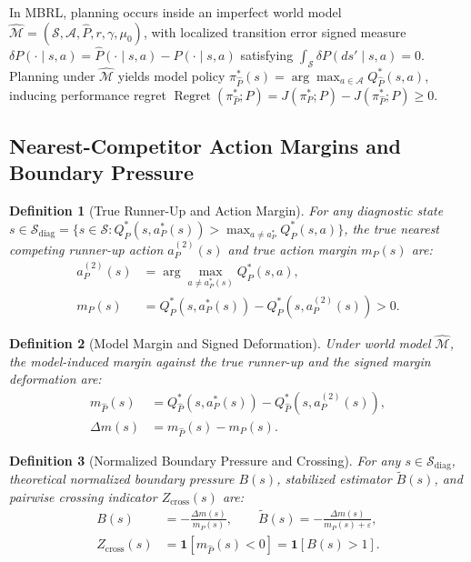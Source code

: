 \documentclass[journal,10pt,twocolumn]{IEEEtran}
\newtheorem{definition}{Definition}
\begin{document}
In MBRL, planning occurs inside an imperfect world model $\hat{\mathcal{M}} = (\mathcal{S}, \mathcal{A}, \hat{P}, r, \gamma, \mu_0)$, with localized transition error signed measure $\delta P(\cdot \mid s, a) = \hat{P}(\cdot \mid s, a) - P(\cdot \mid s, a)$ satisfying $\int_{\mathcal{S}} \delta P(ds' \mid s, a) = 0$. 
Planning under $\hat{\mathcal{M}}$ yields model policy $\pi_{\hat{P}}^*(s) = \arg\max_{a \in \mathcal{A}} Q_{\hat{P}}^*(s, a)$, inducing performance regret $\operatorname{Regret}(\pi_{\hat{P}}^*; P) = J(\pi_P^*; P) - J(\pi_{\hat{P}}^*; P) \ge 0$.

\subsection{Nearest-Competitor Action Margins and Boundary Pressure}
\label{subsec:action_margins}

\begin{definition}[True Runner-Up and Action Margin]
\label{def:runner_up_action}
For any diagnostic state $s \in \mathcal{S}_{\mathrm{diag}} = \{ s \in \mathcal{S} : Q_P^*(s, a_P^*(s)) > \max_{a \neq a_P^*} Q_P^*(s, a) \}$, the true nearest competing runner-up action $a_P^{(2)}(s)$ and true action margin $m_P(s)$ are:
\begin{align}
a_P^{(2)}(s) &= \arg\max_{a \neq a_P^*(s)} Q_P^*(s, a), \label{eq:runner_up_action} \\
m_P(s) &= Q_P^*(s, a_P^*(s)) - Q_P^*(s, a_P^{(2)}(s)) > 0. \label{eq:true_margin}
\end{align}
\end{definition}

\begin{definition}[Model Margin and Signed Deformation]
Under world model $\hat{\mathcal{M}}$, the model-induced margin against the true runner-up and the signed margin deformation are:
\begin{align}
m_{\hat{P}}(s) &= Q_{\hat{P}}^*(s, a_P^*(s)) - Q_{\hat{P}}^*(s, a_P^{(2)}(s)), \label{eq:model_margin} \\
\Delta m(s) &= m_{\hat{P}}(s) - m_P(s). \label{eq:margin_deformation}
\end{align}
\end{definition}

\begin{definition}[Normalized Boundary Pressure and Crossing]
For any $s \in \mathcal{S}_{\mathrm{diag}}$, theoretical normalized boundary pressure $B(s)$, stabilized estimator $\tilde{B}(s)$, and pairwise crossing indicator $Z_{\mathrm{cross}}(s)$ are:
\begin{align}
B(s) &= -\frac{\Delta m(s)}{m_P(s)}, \qquad \tilde{B}(s) = -\frac{\Delta m(s)}{m_P(s) + \varepsilon}, \label{eq:boundary_pressure} \\
Z_{\mathrm{cross}}(s) &= \mathbf{1}\left[ m_{\hat{P}}(s) < 0 \right] = \mathbf{1}\left[ B(s) > 1 \right]. \label{eq:z_cross}
\end{align}
\end{definition}
\end{document}
